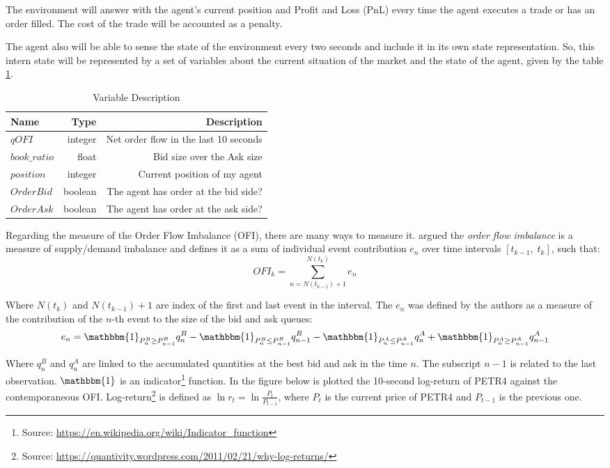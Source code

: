 \documentclass[a4paper]{article}
\begin{document}
The environment will answer with the agent's current position and Profit and Loss (PnL) every time the agent executes a trade or has an order filled. The cost of the trade will be accounted as a penalty.

The agent also will be able to sense the state of the environment every two seconds and include it in its own state representation. So, this intern state will be represented by a set of variables about the current situation of the market and the state of the agent, given by the table \ref{tab:var_description}.

\begin{table}[ht!]
\centering
\begin{tabular}{lrr}
{Name} &                Type &   Description \\
\midrule
$qOFI$ & integer &  Net order flow in the last 10 seconds \\
$book\_ratio$ & float &    Bid size over the Ask size \\
$position$ & integer &    Current position of my agent \\
$OrderBid$ & boolean &    The agent has order at the bid side? \\
$OrderAsk$ & boolean &    The agent has order at the ask side? \\

\end{tabular}
\caption{\label{tab:var_description}Variable Description}
\end{table}


Regarding the measure of the Order Flow Imbalance (OFI), there are many ways to measure it. \cite{cont2014price} argued the \textit{order flow imbalance} is a measure of supply/demand imbalance and defines it as a sum of individual event contribution $e_n$ over time intervals $\left[ t_{k-1}, \; t_k \right]$, such that:
$$OFI_k = \sum^{N(t_k)}_{n=N(t_{k-1})+1} e_n$$

Where $N(t_k)$ and $N(t_{k-1}) + 1$ are index of the first and last event in the interval. The $e_n$ was defined by the authors as a measure of the contribution of the $n$-th event to the size of the bid and ask queues:
$$e_n = \mathbbm{1}_{P_{n}^{B} \geq P_{n-1}^{B}} q^{B}_{n} - \mathbbm{1}_{P_{n}^{B} \leq P_{n-1}^{B}}  q^{B}_{n-1} - \mathbbm{1}_{P_{n}^{A} \leq P_{n-1}^{A}} q^{A}_{n} + \mathbbm{1}_{P_{n}^{A} \geq P_{n-1}^{A}}  q^{A}_{n-1}$$

Where $q^{B}_{n}$ and $q^{A}_{n}$ are linked to the accumulated quantities at the best bid and ask in the time $n$. The subscript $n-1$ is related to the last observation. $\mathbbm{1}$ is an indicator\footnote{Source: \url{https://en.wikipedia.org/wiki/Indicator_function}} function. In the figure below is plotted the 10-second log-return of PETR4 against the contemporaneous OFI.  Log-return\footnote{Source: \url{https://quantivity.wordpress.com/2011/02/21/why-log-returns/}} is defined as $\ln{r_t} = \ln{\frac{P_t}{P_{t-1}}}$, where $P_t$ is the current price of PETR4 and $P_{t-1}$ is the previous one.
\end{document}
